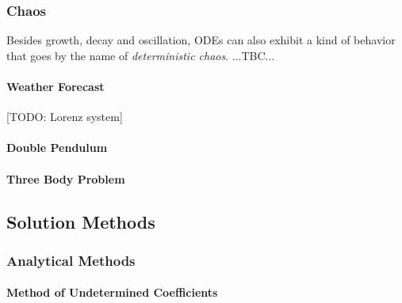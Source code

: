 \subsubsection{Chaos}
Besides growth, decay and oscillation, ODEs can also exhibit a kind of behavior that goes by the name of \emph{deterministic chaos}. ...TBC...

\paragraph{Weather Forecast} [TODO: Lorenz system]

\paragraph{Double Pendulum}

\paragraph{Three Body Problem}






\subsection{Solution Methods}

\subsubsection{Analytical Methods}


\paragraph{Method of Undetermined Coefficients}


